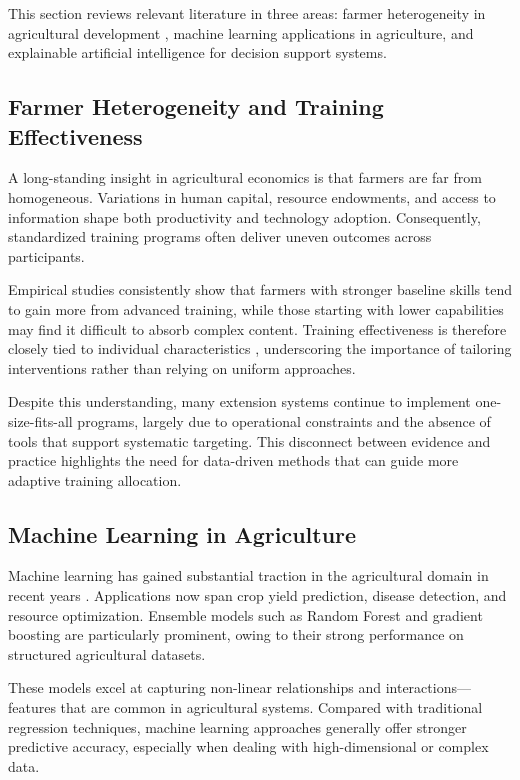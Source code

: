 This section reviews relevant literature in three areas: farmer heterogeneity in agricultural development \cite{feder1985,anderson2004}, machine learning applications in agriculture, and explainable artificial intelligence for decision support systems.

\subsection{Farmer Heterogeneity and Training Effectiveness}

A long-standing insight in agricultural economics is that farmers are far from homogeneous. Variations in human capital, resource endowments, and access to information shape both productivity and technology adoption. Consequently, standardized training programs often deliver uneven outcomes across participants.

Empirical studies consistently show that farmers with stronger baseline skills tend to gain more from advanced training, while those starting with lower capabilities may find it difficult to absorb complex content. Training effectiveness is therefore closely tied to individual characteristics \cite{davis2012}, underscoring the importance of tailoring interventions rather than relying on uniform approaches.

Despite this understanding, many extension systems continue to implement one-size-fits-all programs, largely due to operational constraints and the absence of tools that support systematic targeting. This disconnect between evidence and practice highlights the need for data-driven methods that can guide more adaptive training allocation.

\subsection{Machine Learning in Agriculture}

Machine learning has gained substantial traction in the agricultural domain in recent years \cite{kamilaris2018,liakos2018}. Applications now span crop yield prediction, disease detection, and resource optimization. Ensemble models such as Random Forest and gradient boosting are particularly prominent, owing to their strong performance on structured agricultural datasets.

These models excel at capturing non-linear relationships and interactions—features that are common in agricultural systems. Compared with traditional regression techniques, machine learning approaches generally offer stronger predictive accuracy, especially when dealing with high-dimensional or complex data.

